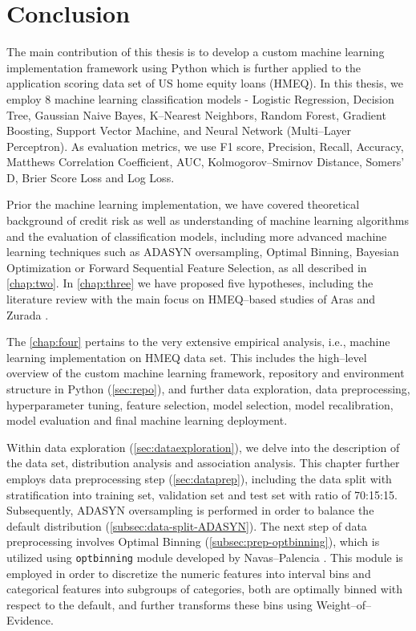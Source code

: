 \chapter{Conclusion}
\label{conclusion}

The main contribution of this thesis is to develop a custom machine learning implementation framework using Python which is further applied to the application scoring data set of US home equity loans (HMEQ).
In this thesis, we employ 8 machine learning classification models - Logistic Regression, Decision Tree, Gaussian Naive Bayes, K--Nearest Neighbors, Random Forest, Gradient Boosting, Support Vector Machine, and Neural Network (Multi--Layer Perceptron). As evaluation metrics, we use F1 score, Precision, Recall, Accuracy, Matthews Correlation Coefficient, AUC, Kolmogorov--Smirnov Distance, Somers' D, Brier Score Loss and Log Loss.

Prior the machine learning implementation, we have covered theoretical background of credit risk as well as understanding of machine learning algorithms and the evaluation of classification models, including more advanced machine learning techniques such as ADASYN oversampling, Optimal Binning, Bayesian Optimization or Forward Sequential Feature Selection, as all described in \autoref{chap:two}.
In \autoref{chap:three} we have proposed five hypotheses, including the literature review with the main focus on HMEQ--based studies of Aras \citep{serkan2021bagging} and Zurada \citep{zurada2014classification}.

The \autoref{chap:four} pertains to the very extensive empirical analysis, i.e., machine learning implementation on HMEQ data set.  This includes the high--level overview of the custom machine learning framework, repository and environment structure in Python (\autoref{sec:repo}), and further data exploration, data preprocessing, hyperparameter tuning, feature selection, model selection, model recalibration, model evaluation and final machine learning deployment.


Within data exploration (\autoref{sec:dataexploration}), we delve into the description of the data set, distribution analysis and association analysis.
This chapter further employs data preprocessing step (\autoref{sec:dataprep}), including the data split with stratification into training set, validation set  and test set with ratio of 70:15:15.
Subsequently, ADASYN oversampling is performed in order to balance the default distribution (\autoref{subsec:data-split-ADASYN}).
The next step of data preprocessing involves Optimal Binning (\autoref{subsec:prep-optbinning}), which is utilized using \lstinline{optbinning} module developed by Navas--Palencia \citep{navas2020optimal}. This module is employed in order to discretize the numeric features into interval bins and categorical features into subgroups of categories, both are optimally binned with respect to the default, and further transforms these bins using Weight--of--Evidence.


